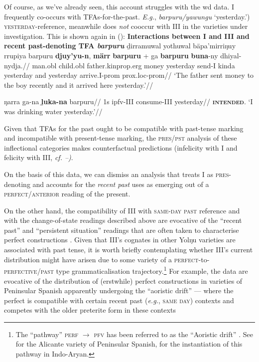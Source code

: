 Of course, as we've already seen, this account struggles with the \acrshort{wd} data. \gls{I} frequently co-occurs with \acrshort{TFA}s-for-the-past. \textit{E.g.}, \textit{barpuru/yawungu} `yesterday.') \textsc{yester\-day-}reference, meanwhile does \textit{not} cooccur with \gls{III} in the varieties under investigation. This is shown again in ():
\pex{}\textbf{Interactions between \gls{I} and \gls{III} and recent past-denoting \acrshort{TFA} \textit{barpuru}}
\a\begingl{}\gla ḏirramuwal yothuwal bäpa'mirriŋuy rrupiya barpuru \textbf{djuy'yu-n}, \textbf{märr} \textbf{barpuru} + ga \textbf{barpuru} \textbf{buna}-ny dhiyal-nydja.//
\glb man.\gls{obl} child.\gls{obl} father.\gls{kinprop}.\gls{erg} money yesterday send-\gls{I} kinda yesterday and yesterday arrive.\gls{I}-\gls{prom} \gls{prox}.\gls{loc}-\gls{prom}//
\glft`The father sent money to the boy recently and it arrived here yesterday.'//
\endgl

\a{}\begingl\gla \ljudge{*}ŋarra ga-na \textbf{ḻuka-na} barpuru//
\glb 1s \gls{ipfv}-\gls{III} consume-\gls{III} yesterday//
\glft\textsc{\textbf{intended}.} `I was drinking water yesterday.'\trailingcitation{[DhG~20190405]}//\endgl


\xe

Given that TFAs for the past ought to be compatible with past-tense marking and incompatible with present-tense marking, the \textsc{pres/pst} analysis of these inflectional categories makes counterfactual predictions (infelicity with \gls{I} and felicity with \gls{III}, \textit{cf. --)}.

 On the basis of this data, we can dismiss an analysis that treats \gls{I} as \textsc{pres}-denoting and accounts for the \textit{recent past} uses as emerging out of a \textsc{perfect/anterior} reading of the present.


On the other hand, the compatibility of \gls{III} with \textsc{same-day past} reference and with the change-of-state readings described above are evocative of the ``recent past'' and ``persistent situation'' readings that are often taken to characterise perfect constructions \citep[Ch. 3]{Comrie1976}. Given that \gls{III}'s cognates in other Yolŋu varieties are associated with past tense, it is worth briefly contemplating whether \gls{III}'s current distribution might have arisen due to some variety of a \textsc{perfect}-to-\textsc{perfective/past} type grammaticalisation trajectory.\footnote{The ``pathway'' \textsc{perf $ \to $ pfv} has been referred to as the ``Aoristic drift'' \citep{Schaden2009,Schaden2012}. See \citet{Schwenter1994} for the Alicante variety of Peninsular Spanish, \citet{Condoravdi2014} for the instantiation of this pathway in Indo-Aryan.} For example, the data are evocative of the distribution of (erstwhile) perfect constructions in varieties of Peninsular Spanish apparently undergoing the ``aoristic drift'' --- where the perfect is compatible with certain recent past (\textit{e.g.}, \textsc{same day}) contexts and competes with the older preterite form in these contexts \citetext{\textit{see also}, \citealp{Howe2006} and, for Catalan, \citealp[115\textit{ff}]{CurelliGotor1990}.}


